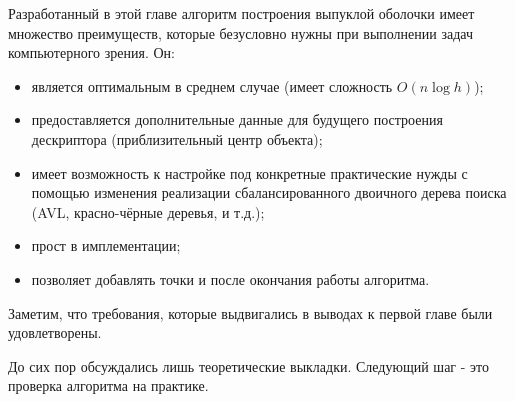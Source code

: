Разработанный в этой главе алгоритм построения выпуклой оболочки имеет множество преимуществ, которые безусловно нужны при выполнении задач компьютерного зрения. Он:
\begin{itemize}
	\item является оптимальным в среднем случае (имеет сложность $O(n \log h)$);
	\item предоставляется дополнительные данные для будущего построения дескриптора (приблизительный центр объекта);
	\item имеет возможность к настройке под конкретные практические нужды с помощью изменения реализации сбалансированного двоичного дерева поиска (AVL, красно-чёрные деревья, и т.д.);
	\item прост в имплементации;
	\item позволяет добавлять точки и после окончания работы алгоритма.
\end{itemize}

Заметим, что требования, которые выдвигались в выводах к первой главе были удовлетворены.

До сих пор обсуждались лишь теоретические выкладки. Следующий шаг - это проверка алгоритма на практике.

